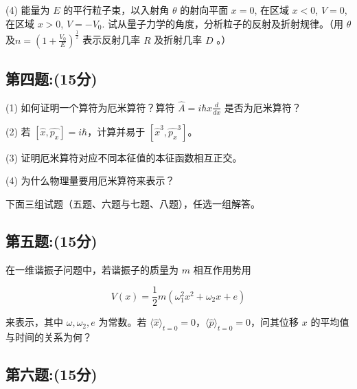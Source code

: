 (4) 
能量为 $E$ 的平行粒子束，以入射角 $\theta$ 的射向平面 $x = 0$, 在区域 $x < 0$, $V = 0$, 在区域 $x > 0$, $V = -V_0$. 试从量子力学的角度，分析粒子的反射及折射规律。（用 $\theta$ 及$n = \left( 1 + \frac{V_0}{E} \right)^{\frac{1}{2}}$
表示反射几率 $R$ 及折射几率 $D$ 。）
\subsection{第四题:(15分)}
(1) 如何证明一个算符为厄米算符？算符 $\hat{A} = i \hbar x \frac{d}{dx}$ 是否为厄米算符？

(2) 若 $[\hat{x}, \hat{p_x}] = i\hbar$，计算并易于 $[\hat{x}^3, \hat{p_x}^3]$。

(3) 证明厄米算符对应不同本征值的本征函数相互正交。

(4) 为什么物理量要用厄米算符来表示？

下面三组试题（五题、六题与七题、八题），任选一组解答。
\subsection{第五题:(15分)}
在一维谐振子问题中，若谐振子的质量为 \(m\) 相互作用势用 

\[
V(x) = \frac{1}{2} m(\omega_1^2 x^2 + \omega_2 x + e)
\]

来表示，其中 \(\omega, \omega_2, e\) 为常数。若 \(\langle \hat{x} \rangle_{t=0} = 0\)，\(\langle \hat{p} \rangle_{t=0} = 0\)，问其位移 \(x\) 的平均值与时间的关系为何？

\subsection{第六题:(15分)}
